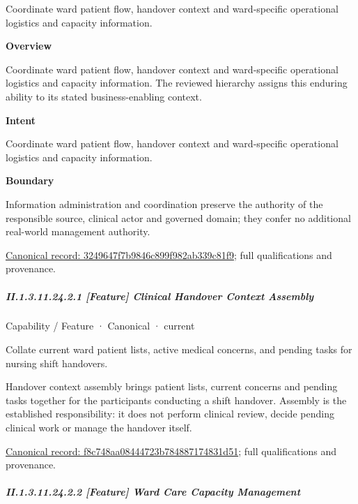 Coordinate ward patient flow, handover context and ward-specific operational logistics and capacity information.



\textbf{Overview}



Coordinate ward patient flow, handover context and ward-specific operational logistics and capacity information. The reviewed hierarchy assigns this enduring ability to its stated business-enabling context.



\textbf{Intent}



Coordinate ward patient flow, handover context and ward-specific operational logistics and capacity information.



\textbf{Boundary}



Information administration and coordination preserve the authority of the responsible source, clinical actor and governed domain; they confer no additional real-world management authority.


{\footnotesize \href{../../../../continuum/strategy/capability/3249647f7b9846c899f982ab339c81f9.md}{Canonical record: 3249647f7b9846c899f982ab339c81f9}; full qualifications and provenance.}\par
\subparagraph*{II.1.3.11.24.2.1 [Feature] Clinical Handover Context Assembly}
\label{navigation:II.1.3.11.24.2.1}

\label{element:f8c748aa08444723b784887174831d51}
{\small Capability / Feature · Canonical · current}\par

Collate current ward patient lists, active medical concerns, and pending tasks for nursing shift handovers.



Handover context assembly brings patient lists, current concerns and pending tasks together for the participants conducting a shift handover. Assembly is the established responsibility: it does not perform clinical review, decide pending clinical work or manage the handover itself.


{\footnotesize \href{../../../../continuum/strategy/capability/feature/f8c748aa08444723b784887174831d51.md}{Canonical record: f8c748aa08444723b784887174831d51}; full qualifications and provenance.}\par
\subparagraph*{II.1.3.11.24.2.2 [Feature] Ward Care Capacity Management}
\label{navigation:II.1.3.11.24.2.2}

